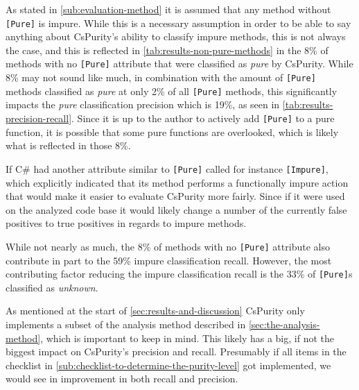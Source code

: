 \documentclass[a4paper,12pt]{article}
\begin{document}
As stated in \autoref{sub:evaluation-method} it is assumed that any method without \texttt{[Pure]} is impure. While this is a necessary assumption in order to be able to say anything about CsPurity's ability to classify impure methods, this is not always the case, and this is reflected in \autoref{tab:results-non-pure-methods} in the 8\% of methods with no \texttt{[Pure]} attribute that were classified as \textit{pure} by CsPurity. While 8\% may not sound like much, in combination with the amount of \texttt{[Pure]} methods classified as \textit{pure} at only 2\% of all \texttt{[Pure]} methods, this significantly impacts the \textit{pure} classification precision which is 19\%, as seen in \autoref{tab:results-precision-recall}. Since it is up to the author to actively add \texttt{[Pure]} to a pure function, it is possible that some pure functions are overlooked, which is likely what is reflected in those 8\%.

If C\# had another attribute similar to \texttt{[Pure]} called for instance \texttt{[Impure]}, which explicitly indicated that its method performs a functionally impure action that would make it easier to evaluate CsPurity more fairly. Since if it were used on the analyzed code base it would likely change a number of the currently false positives to true positives in regards to impure methods. %

While not nearly as much, the 8\% of methods with no \texttt{[Pure]} attribute also contribute in part to the 59\% impure classification recall. However, the most contributing factor reducing the impure classification recall is the 33\% of \texttt{[Pure]}s classified as \textit{unknown}.

As mentioned at the start of \autoref{sec:results-and-discussion} CsPurity only implements a subset of the analysis method described in \autoref{sec:the-analysis-method}, which is important to keep in mind. This likely has a big, if not the biggest impact on CsPurity's precision and recall. Presumably if all items in the checklist in \autoref{sub:checklist-to-determine-the-purity-level} got implemented, we would see in improvement in both recall and precision.

\end{document}
